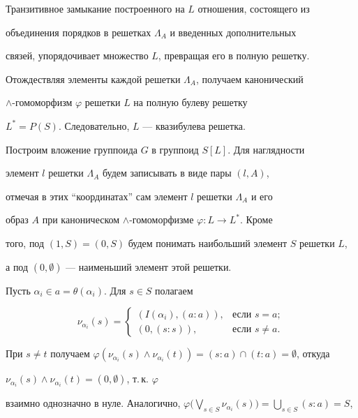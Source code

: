 Транзитивное замыкание построенного на $L$ отношения, состоящего из


объединения порядков в решетках $\Lambda_A$ и введенных дополнительных


связей, упорядочивает множество $L$, превращая его в полную решетку.


Отождествляя элементы каждой решетки $\Lambda_A$, получаем канонический


$\wedge$-гомоморфизм $\varphi$ решетки $L$ на полную булеву решетку


$L^*=P(S)$. Следовательно, $L$ --- квазибулева решетка.





Построим вложение группоида $G$ в группоид $S[L]$. Для наглядности


элемент $l$ решетки $\Lambda_A$ будем записывать в виде пары $(l,A)$,


отмечая в этих ``координатах'' сам элемент $l$ решетки $\Lambda_A$ и его


образ $A$ при каноническом $\wedge$-гомоморфизме $\varphi: L\to L^*$. Кроме


того, под $(1,S)=(0,S)$ будем понимать наибольший элемент $S$ решетки $L$,


а под $(0,\emptyset)$ --- наименьший элемент этой решетки.





Пусть $\alpha_i\in a=\theta(\alpha_i)$. Для $s\in S$ полагаем


$$


\nu_{\alpha_i}(s)=


\begin{cases}


(I(\alpha_i),(a:a)), & \text{если \ } s=a;\\


(0,(s:s)), & \text{если \ } s\ne a.


\end{cases}


$$


При $s\ne t$ получаем $\varphi(\nu_{\alpha_i}(s)\wedge


\nu_{\alpha_i}(t))=(s:a)\cap(t:a)=\emptyset$, откуда


$\nu_{\alpha_i}(s)\wedge\nu_{\alpha_i}(t)=(0,\emptyset)$, т.\,к. $\varphi$


взаимно однозначно в нуле. Аналогично, $\varphi\Big(\bigvee\limits_{s\in


S}\nu_{\alpha_i}(s)\Big)=\bigcup\limits_{s\in S}(s:a)=S$,


